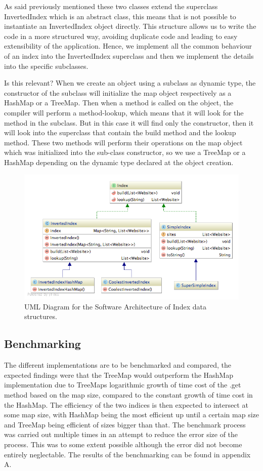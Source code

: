 As said previously mentioned these two classes extend the superclass InvertedIndex which is an abstract class, this means that is not possible to instantiate an InvertedIndex object directly. This structure allows us to write the code in a more structured way, avoiding duplicate code and leading to easy extensibility of the application. Hence, we implement all the common behaviour of an index into the InvertedIndex superclass and then we implement the details into the specific subclasses.

Is this relevant?
When we create an object using a subclass as dynamic type, the constructor of the subclass will initialize the map object respectively as a HashMap or a TreeMap. Then when a method is called on the object, the compiler will perform a method-lookup, which means that it will look for the method in the subclass. But in this case it will find only the constructor, then it will look into the superclass that contain the build method and the lookup method. These two methods will perform their operations on the map object which was initialized into the sub-class constructor, so we use a TreeMap or a HashMap depending on the dynamic type declared at the object creation.


\begin{figure}[t]
	\centering
	\includegraphics[width=\textwidth]{graphics/diagram-index.png}
	\caption{UML Diagram for the Software Architecture of Index data structures.}
	\label{fig:index:uml}
\end{figure}



\subsection{Benchmarking}
The different implementations are to be benchmarked and compared, the expected findings were that the TreeMap would outperform the HashMap implementation due to TreeMaps logarithmic growth of time cost of the .get method based on the map size, compared to the constant growth of time cost in the HashMap. 
The efficiency of the two indices is then expected to intersect at some map size, with HashMap being the most efficient up until a certain map size and TreeMap being efficient of sizes bigger than that.
The benchmark process was carried out multiple times in an attempt to reduce the error size of the process. This was to some extent possible although the error did not become entirely neglectable.
The results of the benchmarking can be found in appendix A.

